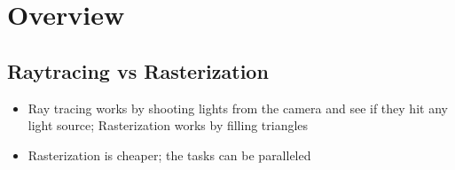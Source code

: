\chapter{Overview}

\section{Raytracing vs Rasterization}

  \begin{itemize}
    \item Ray tracing works by shooting lights from the camera and see if they
    hit any light source; Rasterization works by filling triangles
    \item Rasterization is cheaper; the tasks can be paralleled
  \end{itemize}

